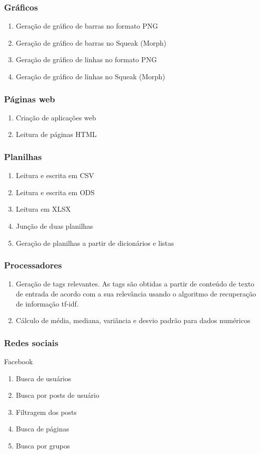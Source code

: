 \subsubsection{Gráficos}
\begin{enumerate}
\item Geração de gráfico de barras no formato PNG
\item Geração de gráfico de barras no Squeak (Morph)
\item Geração de gráfico de linhas no formato PNG
\item Geração de gráfico de linhas no Squeak (Morph)
\end{enumerate}

\subsubsection{Páginas web}
\begin{enumerate}
\item Criação de aplicações web
\item Leitura de páginas HTML
\end{enumerate}

\subsubsection{Planilhas}
\begin{enumerate}
\item Leitura e escrita em CSV
\item Leitura e escrita em ODS
\item Leitura em XLSX
\item Junção de duas planilhas
\item Geração de planilhas a partir de dicionários e listas
\end{enumerate}

\subsubsection{Processadores}
\begin{enumerate}
\item Geração de tags relevantes. As tags são obtidas a partir de conteúdo de texto de entrada de acordo com a sua relevância usando o algoritmo de recuperação de informação tf-idf.
\item Cálculo de média, mediana, variância e desvio padrão para dados numéricos
\end{enumerate}

\subsubsection{Redes sociais}
Facebook
\begin{enumerate}
\item Busca de usuários
\item Busca por posts de usuário
\item Filtragem dos posts
\item Busca de páginas
\item Busca por grupos
\end{enumerate}

